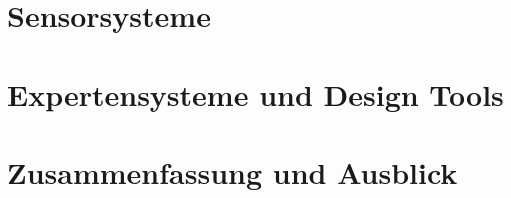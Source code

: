 \documentclass[a4paper,11pt,oneside]{memoir}
\begin{document}


\chapter{Sensorsysteme}
\label{ch:intro}




\chapter{Expertensysteme und Design Tools}
\label{ch:intro}





\chapter{Zusammenfassung und Ausblick}
\label{ch:intro}





%

%


\appendix



\end{document}
